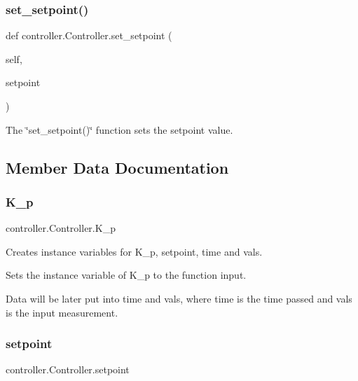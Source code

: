 \subsubsection{\texorpdfstring{set\+\_\+setpoint()}{set\_setpoint()}}
{\footnotesize\ttfamily def controller.\+Controller.\+set\+\_\+setpoint (\begin{DoxyParamCaption}\item[{}]{self,  }\item[{}]{setpoint }\end{DoxyParamCaption})}



The \char`\"{}set\+\_\+setpoint()\char`\"{} function sets the setpoint value. 



\subsection{Member Data Documentation}
\mbox{\label{classcontroller_1_1_controller_a6147d7f8aa12e56ef01036ddd2b55ee9}} 
\subsubsection{\texorpdfstring{K\+\_\+p}{K\_p}}
{\footnotesize\ttfamily controller.\+Controller.\+K\+\_\+p}



Creates instance variables for K\+\_\+p, setpoint, time and vals. 

Sets the instance variable of K\+\_\+p to the function input.

Data will be later put into time and vals, where time is the time passed and vals is the input measurement.\mbox{\label{classcontroller_1_1_controller_ace8a70b35ea15f3f7b6548c64aee1e48}} 
\subsubsection{\texorpdfstring{setpoint}{setpoint}}
{\footnotesize\ttfamily controller.\+Controller.\+setpoint}



